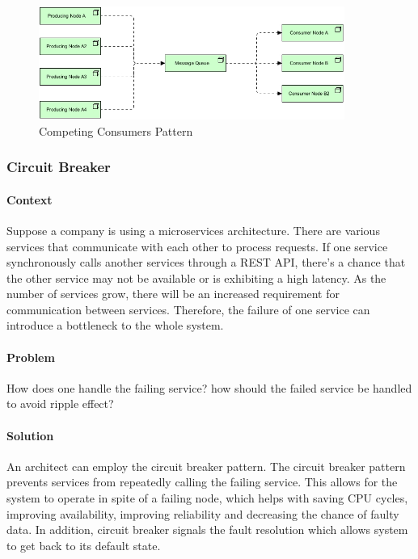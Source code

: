 \documentclass{bmcart}
\begin{document}
\begin{figure}[h]
  \includegraphics[width=10cm]{Media/Competing Consumers.jpg}
  \caption{Competing Consumers Pattern}
  \label{competingConsumer}
\end{figure}

\subsubsection{Circuit Breaker}

\paragraph{Context}

Suppose a company is using a microservices architecture. There are various services that communicate with each other to process requests. If one service synchronously calls another services through a REST API, there's a chance that the other service may not be available or is exhibiting a high latency. As the number of services grow, there will be an increased requirement for communication between services. Therefore, the failure of one service can introduce a bottleneck to the whole system.


\paragraph{Problem}

How does one handle the failing service? how should the failed service be handled to avoid ripple effect? 

\paragraph{Solution}

An architect can employ the circuit breaker pattern. The circuit breaker pattern prevents services from repeatedly calling the failing service. This allows for the system to operate in spite of a failing node, which helps with saving CPU cycles, improving availability, improving reliability and decreasing the chance of faulty data. In addition, circuit breaker signals the fault resolution which allows system to get back to its default state. 
\end{document}
